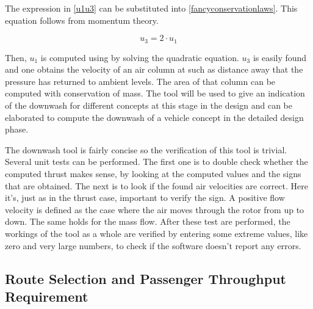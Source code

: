 The expression in \autoref{u1u3} can be substituted into \autoref{fancyconservationlaws}. This equation follows from momentum theory. 

\begin{equation}
\label{u1u3}
    u_3 = 2\cdot u_1
\end{equation}

Then, $u_1$ is computed using by solving the quadratic equation. $u_3$ is easily found and one obtains the velocity of an air column at such as distance away that the pressure has returned to ambient levels. The area of that column can be computed with conservation of mass. The tool will be used to give an indication of the downwash for different concepts at this stage in the design and can be elaborated to compute the downwash of a vehicle concept in the detailed design phase. 

The downwash tool is fairly concise so the verification of this tool is trivial. Several unit tests can be performed. The first one is to double check whether the computed thrust makes sense, by looking at the computed values and the signs that are obtained. The next is to look if the found air velocities are correct. Here it's, just as in the thrust case, important to verify the sign. A positive flow velocity is defined as the case where the air moves through the rotor from up to down. The same holds for the mass flow. After these test are performed, the workings of the tool as a whole are verified by entering some extreme values, like zero and very large numbers, to check if the software doesn't report any errors.   

\subsection{Route Selection and Passenger Throughput Requirement} \label{subsec:routeselection}


